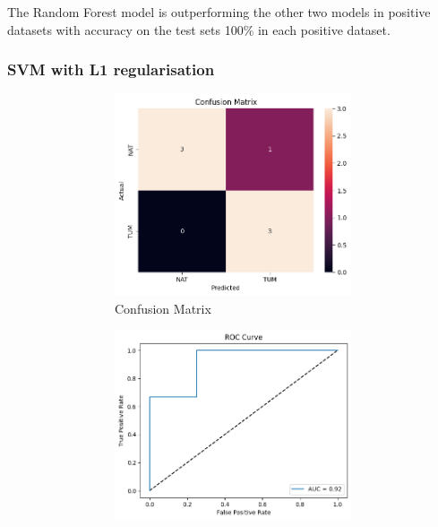 \documentclass[a4paper,12pt]{article}
\begin{document}
The Random Forest model is outperforming the other two models in positive datasets with accuracy on the test sets 100\% in each positive dataset.
\subsubsection{SVM with L1 regularisation}
\begin{figure}[H]
	\centering

	\begin{subfigure}[b]{0.45\textwidth}
		\centering
		\begin{subfigure}[b]{0.49\textwidth}
			\centering
			\includegraphics[width=\textwidth]{images/2psl1c.png}  %
			\caption{Confusion Matrix}
			\label{fig:fig1}
		\end{subfigure}
		\hfill
		\begin{subfigure}[b]{0.49\textwidth}
			\centering
			\includegraphics[width=\textwidth]{images/2psl1r.png}  %

\end{subfigure}
\end{subfigure}
\end{figure}
\end{document}
